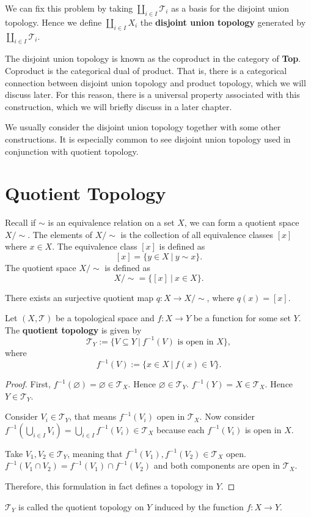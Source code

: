 \documentclass[article,11pt, reqno]{article}
\newtheorem*{proposition}{Proposition}
\theoremstyle{remark}
\newcommand{\tb}{\textbf}
\newcommand{\mc}{\mathcal}
\newcommand{\<}{\langle}
\renewcommand{\>}{\rangle}
\begin{document}
We can fix this problem by taking $\coprod_{i\in I} \mc T_i$ as a basis for the disjoint union topology. Hence we define $\coprod_{i\in I} X_i$ the \tb{disjoint union topology} generated by $\coprod_{i\in I} \mc T_i$.

The disjoint union topology is known as the coproduct in the category of \tb{Top}. Coproduct is the categorical dual of product. That is, there is a categorical connection between disjoint union topology and product topology, which we will discuss later. For this reason, there is a universal property associated with this construction, which we will briefly discuss in a later chapter.

We usually consider the disjoint union topology together with some other constructions. It is especially common to see disjoint union topology used in conjunction with quotient topology.

\section{Quotient Topology}
Recall if $\sim$ is an equivalence relation on a set $X$, we can form a quotient space $X/\sim$. The elements of $X/\sim$ is the collection of all equivalence classes $[x]$ where $x\in X$. The equivalence class $[x]$ is defined as 
$$[x]=\{y\in X\ | \ y\sim x\}.$$
The quotient space $X/\sim$ is defined as
$$X/\sim = \{[x]\ | \ x\in X\}.$$

There exists an surjective quotient map $q: X\rightarrow X/\sim$, where $q(x)=[x]$. 

Let $(X, \mc T)$ be a topological space and $f: X\rightarrow Y$ be a function for some set $Y$. The \tb{quotient topology} is given by
$$\mc T_Y :=\{V\subseteq Y\ | \ f^{-1}(V) \text{ is open in } X\},$$
where 
$$f^{-1}(V):=\{x\in X\ |\ f(x)\in V\}.$$
\fbox{\begin{minipage}{47em}
            \begin{proposition}[6.1.1]
    $\mc T_Y$ indeed gives a topology on $Y$.
\end{proposition}
\end{minipage}}
\begin{proof}
    First, $f^{-1}(\varnothing) = \varnothing\in \mc T_X$. Hence $\varnothing\in \mc T_Y$. $f^{-1}(Y) = X\in \mc T_X$. Hence $Y\in \mc T_Y$.

    Consider $V_i\in\mc T_Y$, that means $f^{-1}(V_i)$ open in $\mc T_X$. Now consider $f^{-1}(\bigcup_{i\in I} V_i) = \bigcup_{i\in I} f^{-1}(V_i)\in\mc T_X$ because each $f^{-1}(V_i)$ is open in $X$.

    Take $V_1, V_2\in\mc T_Y$, meaning that $f^{-1}(V_1), f^{-1}(V_2)\in\mc T_X$ open. $f^{-1}(V_1\cap V_2) = f^{-1}(V_1)\cap f^{-1}(V_2)$ and both components are open in $\mc T_X$.

    Therefore, this formulation in fact defines a topology in $Y$.
\end{proof}
$\mc T_Y$ is called the quotient topology on $Y$ induced by the function $f: X\rightarrow Y$.
\end{document}
